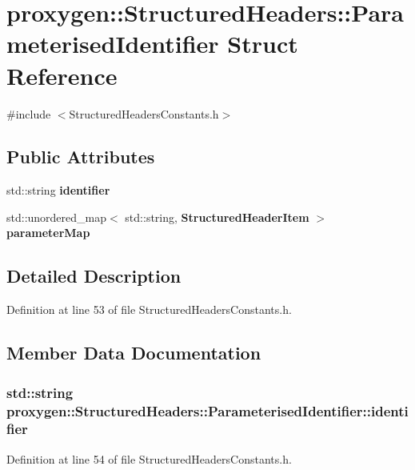 \section{proxygen\+:\+:Structured\+Headers\+:\+:Parameterised\+Identifier Struct Reference}
\label{structproxygen_1_1StructuredHeaders_1_1ParameterisedIdentifier}


{\ttfamily \#include $<$Structured\+Headers\+Constants.\+h$>$}

\subsection*{Public Attributes}
\begin{DoxyCompactItemize}
\item 
std\+::string {\bf identifier}
\item 
std\+::unordered\+\_\+map$<$ std\+::string, {\bf Structured\+Header\+Item} $>$ {\bf parameter\+Map}
\end{DoxyCompactItemize}


\subsection{Detailed Description}


Definition at line 53 of file Structured\+Headers\+Constants.\+h.



\subsection{Member Data Documentation}
\subsubsection[{identifier}]{\setlength{\rightskip}{0pt plus 5cm}std\+::string proxygen\+::\+Structured\+Headers\+::\+Parameterised\+Identifier\+::identifier}\label{structproxygen_1_1StructuredHeaders_1_1ParameterisedIdentifier_a0639a540cc01a2e0102264a895709702}


Definition at line 54 of file Structured\+Headers\+Constants.\+h.



